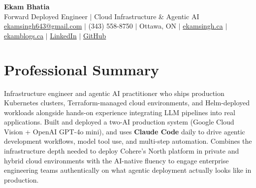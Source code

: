 \documentclass[11pt,a4paper]{article}
\begin{document}
\begin{center}
    {\LARGE \textbf{Ekam Bhatia}} \\
    \vspace{2pt}
    {\normalsize Forward Deployed Engineer $|$ Cloud Infrastructure \& Agentic AI} \\
    \vspace{4pt}
    \small
    \href{mailto:ekamsingh643@gmail.com}{ekamsingh643@gmail.com} $|$
    (343) 558-8750 $|$ Ottawa, ON $|$
    \href{https://www.ekamsingh.ca}{ekamsingh.ca} $|$
    \href{https://www.ekamblogs.ca}{ekamblogs.ca} $|$
    \href{https://www.linkedin.com/in/ekam-bhatia-335840168}{LinkedIn} $|$
    \href{https://github.com/bhat0155}{GitHub}
\end{center}

\section{Professional Summary}
Infrastructure engineer and agentic AI practitioner who ships production Kubernetes clusters, Terraform-managed cloud environments, and Helm-deployed workloads alongside hands-on experience integrating LLM pipelines into real applications. Built and deployed a two-AI production system (Google Cloud Vision + OpenAI GPT-4o mini), and uses \textbf{Claude Code} daily to drive agentic development workflows, model tool use, and multi-step automation. Combines the infrastructure depth needed to deploy Cohere's North platform in private and hybrid cloud environments with the AI-native fluency to engage enterprise engineering teams authentically on what agentic deployment actually looks like in production.

\end{document}
